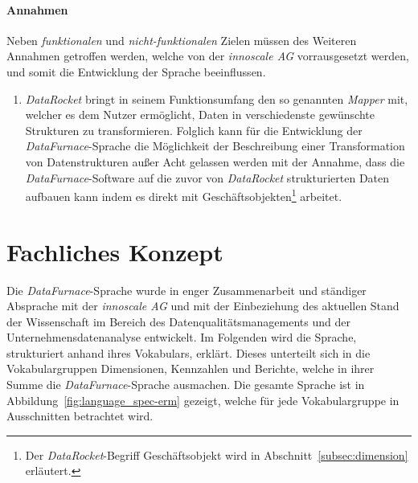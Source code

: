 \documentclass[
  language=german, %
  type=bachelor%
]{isthesis}
\begin{document}
\begin{content}
  \paragraph{Annahmen} Neben \textit{funktionalen} und \textit{nicht-funktionalen} Zielen müssen des
  Weiteren Annahmen getroffen werden, welche von der \textit{innoscale AG}
  vorrausgesetzt werden, und somit die Entwicklung der Sprache beeinflussen.
  \begin{enumerate}
    \item \textit{DataRocket} bringt in seinem Funktionsumfang den so genannten
      \textit{Mapper} mit, welcher es dem Nutzer ermöglicht, Daten in
      verschiedenste gewünschte Strukturen zu transformieren. Folglich kann für
      die Entwicklung der \textit{DataFurnace}-Sprache die Möglichkeit der
      Beschreibung einer Transformation von Datenstrukturen außer Acht gelassen
      werden mit der Annahme, dass die \textit{DataFurnace}-Software auf die
      zuvor von \textit{DataRocket} strukturierten Daten aufbauen kann indem es
      direkt mit Geschäftsobjekten\footnote{Der \textit{DataRocket}-Begriff
      Geschäftsobjekt wird in Abschnitt~\ref{subsec:dimension} erläutert.}
      arbeitet.
  \end{enumerate}


  \section{Fachliches Konzept}

  Die \textit{DataFurnace}-Sprache wurde in enger Zusammenarbeit und ständiger
  Absprache mit der \textit{innoscale AG} und mit der Einbeziehung des
  aktuellen Stand der Wissenschaft im Bereich des Datenqualitätsmanagements und
  der Unternehmensdatenanalyse entwickelt. Im Folgenden wird die Sprache,
  strukturiert anhand ihres Vokabulars, erklärt. Dieses unterteilt sich in die
  Vokabulargruppen Dimensionen, Kennzahlen und Berichte, welche in ihrer Summe
  die \textit{DataFurnace}-Sprache ausmachen. Die gesamte Sprache ist in
  Abbildung~\ref{fig:language_spec-erm} gezeigt, welche für jede
  Vokabulargruppe in Ausschnitten betrachtet wird.

  \begin{figure}[caption={Metamodell der \textit{DataFurnace}-Sprache}, label={fig:language_spec-erm}]
    \resizebox{\columnwidth}{!}{}
  \end{figure}


\end{content}
\end{document}
